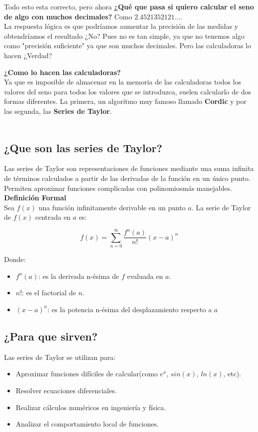 \documentclass[12pt, a4paper, oneside]{article}
\begin{document}
Todo esto esta correcto, pero ahora
\textbf{¿Qué que pasa si quiero calcular el seno de algo
	con muchos decimales?} Como $2.4521352121....$\\

La respuesta lógica es que podríamos aumentar la precisión de las
medidas y obtendríamos el resultado ¿No? Pues no es tan simple, ya
que no tenemos algo como "precisión suficiente" ya que son muchos
decimales. Pero las calculadoras lo hacen ¿Verdad?\\
\par

\textbf{¿Como lo hacen las calculadoras?}\\
Ya que es imposible de almacenar en la memoria de las calculadoras todos
los valores del seno para todos los valores que se introduzca, suelen
calcularlo de dos formas diferentes. La primera, un algoritmo muy famoso
llamado \textbf{Cordic} y por las segunda, las \textbf{Series de Taylor}.
\\
\\

\subsection{¿Que son las series de Taylor?}

Las series de Taylor son representaciones de funciones mediante una suma infinita de términos calculados a partir de las derivadas de la función en un único punto. Permiten aproximar funciones complicadas con polinomiosmás manejables.\\

{\large\textbf{Definición Formal}}\\
Sea $f(x)$ una función infinitamente derivable en un punto $a$. La serie de Taylor de $f(x)$ centrada en $a$ es:

\begingroup
\Large
\begin{equation*}
	f(x) = \sum_{n=0}^\infty \frac{f^n(a)}{n!}(x-a)^n
\end{equation*}
\endgroup

Donde:
\begin{itemize}
	\item $f^n(a)$: es la derivada n-ésima de $f$ evaluada en $a$.
	\item $n!$: es el factorial de $n$.
	\item $(x-a)^n$: es la potencia n-ésima del desplazamiento respecto a $a$
\end{itemize}

\subsection{¿Para que sirven?}
Las series de Taylor se utilizan para:
\begin{itemize}
	\item Aproximar funciones difíciles de calcular(como $e^x$, $sin(x)$, $ln(x)$, etc).
	\item Resolver ecuaciones diferenciales.
	\item Realizar cálculos numéricos en ingeniería y física.
	\item Analizar el comportamiento local de funciones.
\end{itemize}
\end{document}
